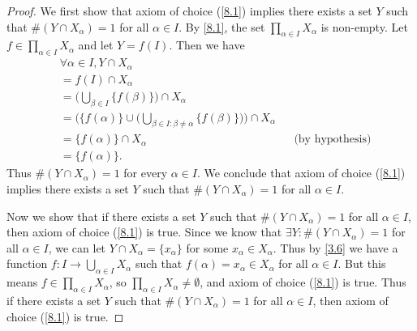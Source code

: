 \begin{proof}
  We first show that axiom of choice (\cref{8.1}) implies there exists a set \(Y\) such that \(\#(Y \cap X_{\alpha}) = 1\) for all \(\alpha \in I\).
  By \cref{8.1}, the set \(\prod_{\alpha \in I} X_{\alpha}\) is non-empty.
  Let \(f \in \prod_{\alpha \in I} X_{\alpha}\) and let \(Y = f(I)\).
  Then we have
  \begin{align*}
     & \forall \alpha \in I, Y \cap X_{\alpha}                                                                                                         \\
     & = f(I) \cap X_{\alpha}                                                                                                                          \\
     & = \Bigg(\bigcup_{\beta \in I} \{f(\beta)\}\Bigg) \cap X_{\alpha}                                                                                \\
     & = \Bigg(\{f(\alpha)\} \cup \bigg(\bigcup_{\beta \in I : \beta \neq \alpha} \{f(\beta)\}\bigg)\Bigg) \cap X_{\alpha}                             \\
     & = \{f(\alpha)\} \cap X_{\alpha}                                                                                     &  & \text{(by hypothesis)} \\
     & = \{f(\alpha)\}.
  \end{align*}
  Thus \(\#(Y \cap X_{\alpha}) = 1\) for every \(\alpha \in I\).
  We conclude that axiom of choice (\cref{8.1}) implies there exists a set \(Y\) such that \(\#(Y \cap X_{\alpha}) = 1\) for all \(\alpha \in I\).

  Now we show that if there exists a set \(Y\) such that \(\#(Y \cap X_{\alpha}) = 1\) for all \(\alpha \in I\), then axiom of choice (\cref{8.1}) is true.
  Since we know that \(\exists Y : \#(Y \cap X_{\alpha}) = 1\) for all \(\alpha \in I\), we can let \(Y \cap X_{\alpha} = \{x_{\alpha}\}\) for some \(x_{\alpha} \in X_{\alpha}\).
  Thus by \cref{3.6} we have a function \(f : I \to \bigcup_{\alpha \in I} X_{\alpha}\) such that \(f(\alpha) = x_{\alpha} \in X_{\alpha}\) for all \(\alpha \in I\).
  But this means \(f \in \prod_{\alpha \in I} X_{\alpha}\), so \(\prod_{\alpha \in I} X_{\alpha} \neq \emptyset\), and axiom of choice (\cref{8.1}) is true.
  Thus if there exists a set \(Y\) such that \(\#(Y \cap X_{\alpha}) = 1\) for all \(\alpha \in I\), then axiom of choice (\cref{8.1}) is true.
\end{proof}

